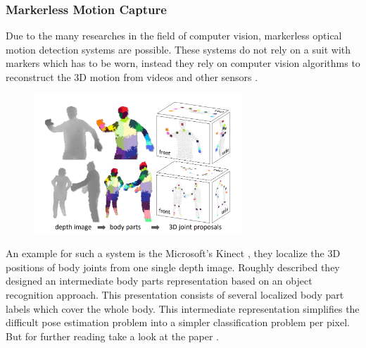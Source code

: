 \subsubsection{Markerless Motion Capture}
Due to the many researches in the field of computer vision, markerless optical motion detection systems are possible. These systems do not rely on a suit with markers which has to be worn, instead they rely on computer vision algorithms to reconstruct the 3D motion from videos and other sensors \cite{motioncapturetechnologies}. 
\begin{figure}[h]
	\centering
	\includegraphics[width=0.7\textwidth]{./images/microsoft.png}
	\label{fig:messi}
\end{figure}
An example for such a system is the Microsoft's Kinect \cite{microsoft}, they localize the 3D positions of body joints from one single depth image. Roughly described they designed an intermediate body parts representation based on an object recognition approach. This presentation consists of several localized body part labels which cover the whole body. This intermediate representation simplifies the difficult pose estimation problem into a simpler classification problem per pixel. But for further reading take a look at the paper \cite{microsoft}.

